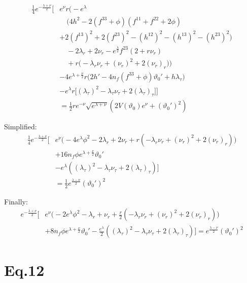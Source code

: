 \documentclass[12pt]{article}
\begin{document}
\begin{align*}
\frac{1}{4} e^{-\frac{\lambda + \nu}{2}} \Big[
 & e^{\nu} r \Big(
     - e^{\lambda} \\ & \quad \Big(
       4h^2 - 2(f^{33} + \phi)(f^{11} + f^{22} + 2\phi) \\
       & + 2(f^{13})^2 + 2(f^{23})^2
       - (h^{12})^2 - (h^{13})^2 - (h^{23})^2
     \Big) \\
 & \quad - 2 \lambda_r + 2 \nu_r
       - e^{\frac{\lambda}{2}} f^{23}\left(2 + r\nu_r\right) \\
 & \quad + r \Big(
       - \lambda_r \nu_r
       + (\nu_r)^2
       + 2 (\nu_r)_r
     \Big)
   \Big) \\
 & - 4 e^{\lambda + \frac{\nu}{2}} r
   \Big(
     2 h' - 4 n_f (f^{33} + \phi) \vartheta_0' + h\lambda_\tau
   \Big) \\
 & - e^{\lambda} r
   \Big[
     \left(\lambda_\tau\right)^2
     - \lambda_\tau \nu_\tau
     + 2 (\lambda_\tau)_\tau
   \Big]
\Big] \\
&= \frac{1}{2} r e^{-\nu} \sqrt{e^{\lambda + \nu}}
   \left( 2 V(\vartheta_0) e^{\nu} + (\vartheta_0')^2 \right)
\end{align*}

Simplified:
\begin{align*}
\frac{1}{4} e^{-\frac{\lambda + \nu}{2}} \Big[
 & e^{\nu} \Big(
     - 4e^{\lambda}\phi^2 - 2 \lambda_r + 2 \nu_r 
      + r ( - \lambda_r \nu_r + (\nu_r)^2 + 2 (\nu_r)_r )
   \Big) \\
 & + 16 n_f \phi e^{\lambda + \frac{\nu}{2}} \vartheta_0' \\
& - e^{\lambda}
   (
     \left(\lambda_\tau\right)^2
     - \lambda_\tau \nu_\tau
     + 2 (\lambda_\tau)_\tau
   )
\Big] \\
&= \frac{1}{2} e^\frac{\lambda - \nu}{2}(\vartheta_0')^2
\end{align*}

Finally:
\begin{align*}
e^{-\frac{\lambda + \nu}{2}} \Big[
 & e^{\nu} \Big(
     - 2e^{\lambda}\phi^2 - \lambda_r + \nu_r 
      + \frac{r}{2} ( - \lambda_r \nu_r + (\nu_r)^2 + 2 (\nu_r)_r )
   \Big) \\
 & + 8 n_f \phi e^{\lambda + \frac{\nu}{2}} \vartheta_0' - \frac{e^{\lambda}}{2} (\left(\lambda_\tau\right)^2 - \lambda_\tau \nu_\tau + 2 (\lambda_\tau)_\tau)
\Big] = e^\frac{\lambda - \nu}{2}(\vartheta_0')^2
\end{align*}

\section*{Eq.12}
\end{document}
